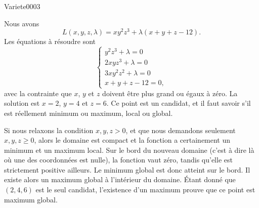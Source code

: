 
\begin{corrige}{Variete0003}

	Nous avons
	\begin{equation}
		L(x,y,z,\lambda)=xy^2z^3+\lambda(x+y+z-12).
	\end{equation}
	Les équations à résoudre sont
	\begin{equation}
		\left\{
		\begin{array}{ll}
			y^2z^3+\lambda=0\\
			2xyz^3+\lambda=0\\
			3xy^2z^2+\lambda=0\\
			x+y+z-12=0,
		\end{array}
		\right.
	\end{equation}
	avec la contrainte que $x$, $y$ et $z$ doivent être plus grand ou égaux à zéro. La solution est $x=2$, $y=4$ et $z=6$. Ce point est un candidat, et il faut savoir s'il est réellement minimum ou maximum, local ou global.

	Si nous relaxons la condition $x,y,z>0$, et que nous demandons seulement $x,y,z\geq 0$, alors le domaine est compact et la fonction a certainement un minimum et un maximum local. Sur le bord du nouveau domaine (c'est à dire là où une des coordonnées est nulle), la fonction vaut zéro, tandis qu'elle est strictement positive ailleurs. Le minimum global est donc atteint sur le bord. Il existe alors un maximum global à l'intérieur du domaine. Étant donné que $(2,4,6)$ est le seul candidat, l'existence d'un maximum prouve que ce point est maximum global.

\end{corrige}
